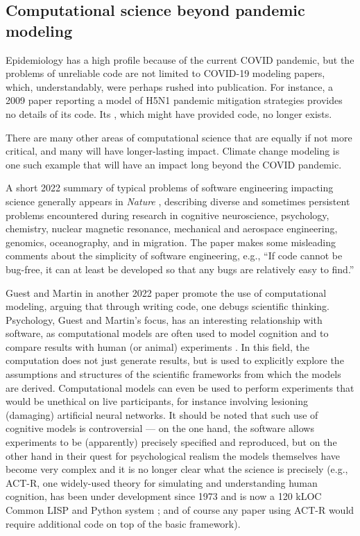 \documentclass{comjnl}
\begin{document}
\subsection{Computational science beyond pandemic modeling}
\label{section-science-beyond-pandemic-modeling}
\begin{change}
Epidemiology has a high profile because of the current COVID pandemic, but the problems of unreliable code are not limited to COVID-19 modeling papers, which, understandably, were perhaps rushed into publication. For instance, a 2009 paper reporting a model of H5N1 pandemic mitigation strategies \cite{flu-model} provides no details of its code. Its \supplement, which might have provided code, no longer exists.

There are many other areas of computational science that are equally if not more critical, and many will have longer-lasting impact. Climate change modeling is one such example that will have an impact long beyond the COVID pandemic.

A short 2022 summary of typical problems of software engineering impacting science generally appears in \emph{Nature\/} \cite{nature-review}, describing diverse and sometimes persistent problems encountered during research in cognitive neuroscience, psychology, chemistry, nuclear magnetic resonance, mechanical and aerospace engineering, genomics, oceanography, and in migration. The paper \cite{nature-review}  makes some misleading comments about the simplicity of software engineering, e.g., ``If code cannot be bug-free, it can at least be developed so that any bugs are relatively easy to find.''

Guest and Martin \cite{psychological-modeling} in another 2022 paper promote the use of computational modeling, arguing that through writing code, one debugs scientific thinking. Psychology, Guest and Martin's focus, has an interesting relationship with software, as computational models are often used to model cognition and to compare results with human (or animal) experiments \cite{psychological-modeling}. In this field, the computation does not just generate results, but is used to explicitly explore the assumptions and structures of the scientific frameworks from which the models are derived. Computational models can even be used to perform experiments that would be unethical on live participants, for instance involving lesioning (damaging) artificial neural networks. It should be noted that such use of cognitive models is controversial --- on the one hand, the software allows experiments to be (apparently) precisely specified and reproduced, but on the other hand in their quest for psychological realism the models themselves have become very complex and it is no longer clear what the science is precisely (e.g., ACT-R, one widely-used theory for simulating and understanding human cognition, has been under development since 1973 and is now a 120 kLOC Common LISP and Python system \cite{actr}; and of course any paper using ACT-R would require additional code on top of the basic framework).


\end{change}
\end{document}
